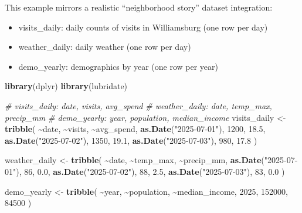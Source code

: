 \documentclass[
  11pt,
]{article}
\newenvironment{Shaded}{\begin{snugshade}}{\end{snugshade}}
\newcommand{\CommentTok}[1]{\textcolor[rgb]{0.56,0.35,0.01}{\textit{#1}}}
\newcommand{\DecValTok}[1]{\textcolor[rgb]{0.00,0.00,0.81}{#1}}
\newcommand{\FloatTok}[1]{\textcolor[rgb]{0.00,0.00,0.81}{#1}}
\newcommand{\FunctionTok}[1]{\textcolor[rgb]{0.13,0.29,0.53}{\textbf{#1}}}
\newcommand{\NormalTok}[1]{#1}
\newcommand{\OtherTok}[1]{\textcolor[rgb]{0.56,0.35,0.01}{#1}}
\newcommand{\SpecialCharTok}[1]{\textcolor[rgb]{0.81,0.36,0.00}{\textbf{#1}}}
\newcommand{\StringTok}[1]{\textcolor[rgb]{0.31,0.60,0.02}{#1}}
\providecommand{\tightlist}{%
  \setlength{\itemsep}{0pt}\setlength{\parskip}{0pt}}
\begin{document}
This example mirrors a realistic ``neighborhood story'' dataset
integration:

\begin{itemize}
\tightlist
\item
  visits\_daily: daily counts of visits in Williamsburg (one row per
  day)
\item
  weather\_daily: daily weather (one row per day)
\item
  demo\_yearly: demographics by year (one row per year)
\end{itemize}

\begin{Shaded}
\begin{Highlighting}[]
\FunctionTok{library}\NormalTok{(dplyr)}
\FunctionTok{library}\NormalTok{(lubridate)}

\CommentTok{\# visits\_daily: date, visits, avg\_spend}
\CommentTok{\# weather\_daily: date, temp\_max, precip\_mm}
\CommentTok{\# demo\_yearly: year, population, median\_income}
\NormalTok{visits\_daily }\OtherTok{\textless{}{-}} \FunctionTok{tribble}\NormalTok{(}
  \SpecialCharTok{\textasciitilde{}}\NormalTok{date,        }\SpecialCharTok{\textasciitilde{}}\NormalTok{visits, }\SpecialCharTok{\textasciitilde{}}\NormalTok{avg\_spend,}
  \FunctionTok{as.Date}\NormalTok{(}\StringTok{"2025{-}07{-}01"}\NormalTok{), }\DecValTok{1200}\NormalTok{,   }\FloatTok{18.5}\NormalTok{,}
  \FunctionTok{as.Date}\NormalTok{(}\StringTok{"2025{-}07{-}02"}\NormalTok{), }\DecValTok{1350}\NormalTok{,   }\FloatTok{19.1}\NormalTok{,}
  \FunctionTok{as.Date}\NormalTok{(}\StringTok{"2025{-}07{-}03"}\NormalTok{),  }\DecValTok{980}\NormalTok{,   }\FloatTok{17.8}
\NormalTok{)}

\NormalTok{weather\_daily }\OtherTok{\textless{}{-}} \FunctionTok{tribble}\NormalTok{(}
  \SpecialCharTok{\textasciitilde{}}\NormalTok{date,        }\SpecialCharTok{\textasciitilde{}}\NormalTok{temp\_max, }\SpecialCharTok{\textasciitilde{}}\NormalTok{precip\_mm,}
  \FunctionTok{as.Date}\NormalTok{(}\StringTok{"2025{-}07{-}01"}\NormalTok{),  }\DecValTok{86}\NormalTok{,       }\FloatTok{0.0}\NormalTok{,}
  \FunctionTok{as.Date}\NormalTok{(}\StringTok{"2025{-}07{-}02"}\NormalTok{),  }\DecValTok{88}\NormalTok{,       }\FloatTok{2.5}\NormalTok{,}
  \FunctionTok{as.Date}\NormalTok{(}\StringTok{"2025{-}07{-}03"}\NormalTok{),  }\DecValTok{83}\NormalTok{,       }\FloatTok{0.0}
\NormalTok{)}

\NormalTok{demo\_yearly }\OtherTok{\textless{}{-}} \FunctionTok{tribble}\NormalTok{(}
  \SpecialCharTok{\textasciitilde{}}\NormalTok{year, }\SpecialCharTok{\textasciitilde{}}\NormalTok{population, }\SpecialCharTok{\textasciitilde{}}\NormalTok{median\_income,}
   \DecValTok{2025}\NormalTok{,     }\DecValTok{152000}\NormalTok{,         }\DecValTok{84500}
\NormalTok{)}


\end{Highlighting}
\end{Shaded}
\end{document}
